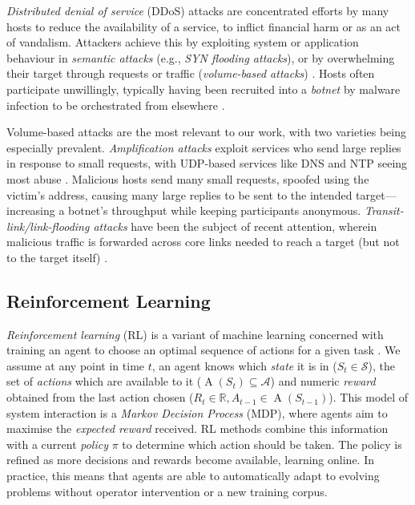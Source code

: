 \documentclass[10pt, times, conference, letterpaper]{IEEEtran}
\begin{document}

\emph{Distributed denial of service} (DDoS) attacks are concentrated efforts by many hosts to reduce the availability of a service, to inflict financial harm or as an act of vandalism.
Attackers achieve this by exploiting system or application behaviour in \emph{semantic attacks} (e.g., \emph{SYN flooding attacks}), or by overwhelming their target through requests or traffic (\emph{volume-based attacks}) \cite{DBLP:conf/imc/JonkerKKRSD17}.
Hosts often participate unwillingly, typically having been recruited into a \emph{botnet} by malware infection to be orchestrated from elsewhere \cite{DBLP:conf/uss/AntonakakisABBB17}.

Volume-based attacks are the most relevant to our work, with two varieties being especially prevalent.
\emph{Amplification attacks} exploit services who send large replies in response to small requests, with UDP-based services like DNS and NTP seeing most abuse \cite{DBLP:conf/ndss/Rossow14, DBLP:conf/uss/KuhrerHRH14}.
Malicious hosts send many small requests, spoofed using the victim's address, causing many large replies to be sent to the intended target---increasing a botnet's throughput while keeping participants anonymous.
\emph{Transit-link/link-flooding attacks} have been the subject of recent attention, wherein malicious traffic is forwarded across core links needed to reach a target (but not to the target itself) \cite{DBLP:conf/sp/KangLG13, DBLP:conf/esorics/StuderP09}.

\subsection{Reinforcement Learning}\label{sec:reinforcement-learning}
\emph{Reinforcement learning} (RL) is a variant of machine learning concerned with training an agent to choose an optimal sequence of actions for a given task \cite{RL2E}.
We assume at any point in time $t$, an agent knows which \emph{state} it is in ($S_t \in \mathcal{S}$), the set of \emph{actions} which are available to it ($\operatorname{A}(S_t) \subseteq \mathcal{A}$) and numeric \emph{reward} obtained from the last action chosen ($R_t \in \mathbb{R}, A_{t-1} \in \operatorname{A}(S_{t-1})$).
This model of system interaction is a \emph{Markov Decision Process} (MDP), where agents aim to maximise the \emph{expected reward} received.
RL methods combine this information with a current \emph{policy} $\pi$ to determine which action should be taken.
The policy is refined as more decisions and rewards become available, learning online.
In practice, this means that agents are able to automatically adapt to evolving problems without operator intervention or a new training corpus.
\end{document}
